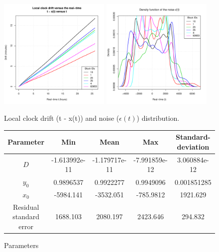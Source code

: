 \documentclass[11pt]{article}
\begin{document}
\begin{figure}[h!]
\centering
\includegraphics[width=0.475\textwidth]{pictures/drift.pdf}
\includegraphics[width=0.475\textwidth]{pictures/noise.pdf}
\caption{Local clock drift (t - x(t)) and noise ($\epsilon(t)$) distribution.}
\label{fig:drift-noise}
\end{figure}

\begin{figure}[h!]
\footnotesize
\begin{center}
\begin{tabular}{|c|c|c|c|c|} 
\hline
Parameter & Min & Mean & Max & Standard-deviation \\
\hline
$D$ & -1.613992e-11 & -1.179717e-11 & -7.991859e-12 & 3.060884e-12 \\
\hline
$y_0$ & 0.9896537 & 0.9922277 & 0.9949096 & 0.001851285\\
\hline
$x_0$ & -5984.141 & -3532.051 & -785.9812 & 1921.629\\
\hline
Residual standard error & 1688.103 &  2080.197  & 2423.646 & 294.832\\
\hline
\end{tabular}
\end{center}
\caption{Parameters}
\end{figure}
\end{document}
